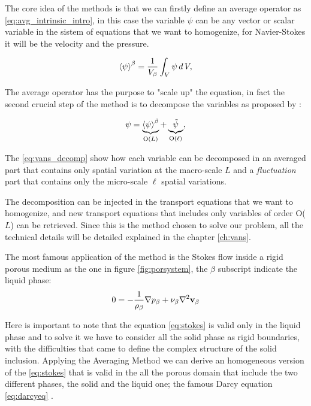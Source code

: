 The core idea of the methods is that we can firstly define an average operator as \eqref{eq:avg_intrinsic_intro}, in this case the variable $\psi$ can be any vector or scalar variable in the sistem of equations that we want to homogenize, for Navier-Stokes it will be the velocity and the pressure.

\begin{equation}
{\left< \psi \right>}^{\beta} = \dfrac{1}{V_\beta} \int_{V} \psi \, d \, V,
\label{eq:avg_intrinsic_intro}
\end{equation}

The average operator has the purpose to "scale up" the equation, in fact the second crucial step of the method is to decompose the variables as proposed by \citet{gray1975derivation}:

\begin{equation}
\psi =   \underbrace{ {\left< \psi \right>}^{\beta} }_\text{O($L$)}  +  \underbrace{\tilde{\psi} }_\text{O($\ell$)},
\label{eq:vans_decomp}
\end{equation}

The \eqref{eq:vans_decomp} show how each variable can be decomposed in an averaged part that contains only spatial variation at the macro-scale $L$ and a \textit{fluctuation} part that contains only the micro-scale $\ell$ spatial variations.

The decomposition can be injected in the transport equations that we want to homogenize, and new transport equations that includes only variables of order O($L$) can be retrieved.
Since this is the method chosen to solve our problem, all the technical details will be detailed explained in the chapter \ref{ch:vans}.

The most famous application of the method is the Stokes flow inside a rigid porous medium as the one in figure \ref{fig:porsystem}, the $\beta$ subscript indicate the liquid phase:
\begin{equation}
0 = -\dfrac{1}{\rho_{\beta}} \nabla p_{\beta} +\nu_{\beta} \nabla^2 \textbf{v}_{\beta}
\label{eq:stokes}
\end{equation} 

Here is important to note that the equation \eqref{eq:stokes} is valid only in the liquid phase and to solve it we have to consider all the solid phase as rigid boundaries, with the difficulties that came to define the complex structure of the solid inclusion.
Applying the Averaging Method we can derive an homogeneous version of the \eqref{eq:stokes} that is valid in the all the porous domain that include the two different phases, the solid and the liquid one; the famous Darcy equation \eqref{eq:darcyeq} \citet{whitaker1986flow}.

